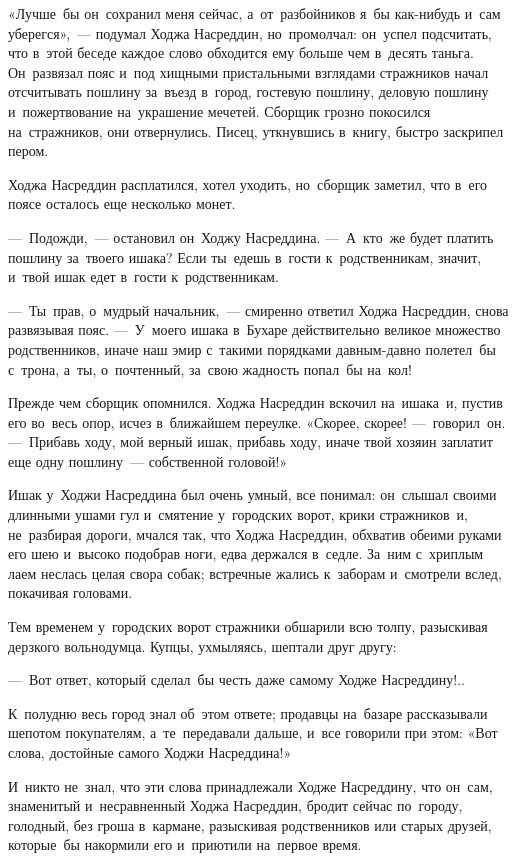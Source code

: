 \documentclass[12pt,a4paper]{book}
\begin{document}
«Лучше~бы он~сохранил меня сейчас, а~от~разбойников я~бы как-нибудь и~сам уберегся»,~— подумал Ходжа Насреддин, но~промолчал: он~успел подсчитать, что в~этой беседе каждое слово обходится ему больше чем в~десять таньга. Он~развязал пояс и~под хищными пристальными взглядами стражников начал отсчитывать пошлину за~въезд в~город, гостевую пошлину, деловую пошлину и~пожертвование на~украшение мечетей. Сборщик грозно покосился на~стражников, они отвернулись. Писец, уткнувшись в~книгу, быстро заскрипел пером.

Ходжа Насреддин расплатился, хотел уходить, но~сборщик заметил, что в~его поясе осталось еще несколько монет.

—~Подожди,~— остановил он~Ходжу Насреддина. —~А~кто~же будет платить пошлину за~твоего ишака? Если ты~едешь в~гости к~родственникам, значит, и~твой ишак едет в~гости к~родственникам.

—~Ты~прав, о~мудрый начальник,~— смиренно ответил Ходжа Насреддин, снова развязывая пояс. —~У~моего ишака в~Бухаре действительно великое множество родственников, иначе наш эмир с~такими порядками давным-давно полетел~бы с~трона, а~ты, о~почтенный, за~свою жадность попал~бы на~кол!

Прежде чем сборщик опомнился. Ходжа Насреддин вскочил на~ишака~и, пустив его во~весь опор, исчез в~ближайшем переулке. «Скорее, скорее! —~говорил~он. —~Прибавь ходу, мой верный ишак, прибавь ходу, иначе твой хозяин заплатит еще одну пошлину~— собственной головой!»

Ишак у~Ходжи Насреддина был очень умный, все понимал: он~слышал своими длинными ушами гул и~смятение у~городских ворот, крики стражников~и, не~разбирая дороги, мчался так, что Ходжа Насреддин, обхватив обеими руками его шею и~высоко подобрав ноги, едва держался в~седле. За~ним с~хриплым лаем неслась целая свора собак; встречные жались к~заборам и~смотрели вслед, покачивая головами.

Тем временем у~городских ворот стражники обшарили всю толпу, разыскивая дерзкого вольнодумца. Купцы, ухмыляясь, шептали друг другу:

—~Вот ответ, который сделал~бы честь даже самому Ходже Насреддину!..

К~полудню весь город знал об~этом ответе; продавцы на~базаре рассказывали шепотом покупателям, а~те~передавали дальше, и~все говорили при этом: «Вот слова, достойные самого Ходжи Насреддина!»

И~никто не~знал, что эти слова принадлежали Ходже Насреддину, что он~сам, знаменитый и~несравненный Ходжа Насреддин, бродит сейчас по~городу, голодный, без гроша в~кармане, разыскивая родственников или старых друзей, которые~бы накормили его и~приютили на~первое время.
\end{document}
